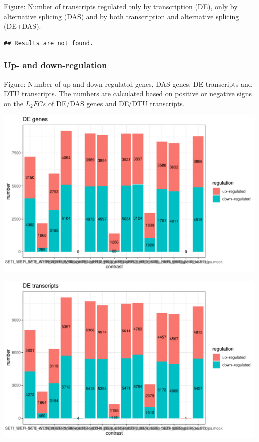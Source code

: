 \documentclass[]{article}
\begin{document}
Figure: Number of transcripts regulated only by transcription (DE), only
by alternative splicing (DAS) and by both transcription and alternative
splicing (DE+DAS).

\begin{verbatim}
## Results are not found.
\end{verbatim}

\subsubsection{Up- and down-regulation}\label{up--and-down-regulation}

Figure: Number of up and down regulated genes, DAS genes, DE transcripts
and DTU transcripts. The numbers are calculated based on positive or
negative signs on the \(L_2FCs\) of DE/DAS genes and DE/DTU transcripts.

\includegraphics[width=16.67in]{X2025.01.13.16.34.12.j145/figure/DE genes up and down regulation numbers}

\includegraphics[width=16.67in]{X2025.01.13.16.34.12.j145/figure/DE transcripts up and down regulation numbers}
\end{document}
